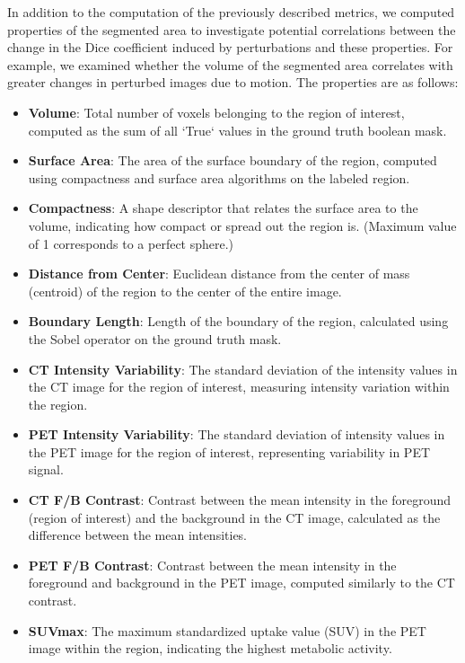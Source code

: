 In addition to the computation of the previously described metrics, we computed properties of the segmented area to 
investigate potential correlations between the change in the Dice coefficient induced by perturbations and these properties. 
For example, we examined whether the volume of the segmented area correlates with greater changes in perturbed images due 
to motion. The properties are as follows:
\begin{itemize}
    \setlength\itemsep{1pt} 
    \setlength\parskip{0pt} 
    \setlength\topsep{0pt} 
    \label{list:properties}
    \item \textbf{Volume}: Total number of voxels belonging to the region of interest, computed as the sum of all `True` values in the ground truth boolean mask.
    \item \textbf{Surface Area}: The area of the surface boundary of the region, computed using compactness and surface area algorithms on the labeled region.
    \item \textbf{Compactness}: A shape descriptor that relates the surface area to the volume, indicating how compact or spread out the region is. (Maximum value of 1 corresponds to a perfect sphere.)
    \item \textbf{Distance from Center}: Euclidean distance from the center of mass (centroid) of the region to the center of the entire image.
    \item \textbf{Boundary Length}: Length of the boundary of the region, calculated using the Sobel operator on the ground truth mask.
    \item \textbf{CT Intensity Variability}: The standard deviation of the intensity values in the CT image for the region of interest, measuring intensity variation within the region.
    \item \textbf{PET Intensity Variability}: The standard deviation of intensity values in the PET image for the region of interest, representing variability in PET signal.
    \item \textbf{CT F/B Contrast}: Contrast between the mean intensity in the foreground (region of interest) and the background in the CT image, calculated as the difference between the mean intensities.
    \item \textbf{PET F/B Contrast}: Contrast between the mean intensity in the foreground and background in the PET image, computed similarly to the CT contrast.
    \item \textbf{SUVmax}: The maximum standardized uptake value (SUV) in the PET image within the region, indicating the highest metabolic activity.

\end{itemize}
